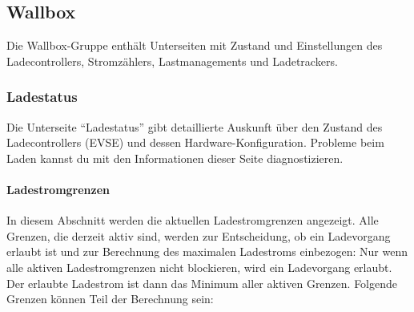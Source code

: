 \documentclass[a4paper,10pt]{article}
\begin{document}
\begin{multicols*}{2}
    \vfill
    \null

    \columnbreak

    \subsection{Wallbox}
    Die Wallbox-Gruppe enthält Unterseiten mit Zustand und Einstellungen des Ladecontrollers, Stromzählers, Lastmanagements und Ladetrackers.

    \subsubsection{Ladestatus}\label{evse}
    Die Unterseite \enquote{Ladestatus} gibt detaillierte Auskunft über den Zustand
    des Ladecontrollers (EVSE) und dessen Hardware-Konfiguration. Probleme beim Laden
    kannst du mit den Informationen dieser Seite diagnostizieren.

    \paragraph{Ladestromgrenzen}
    In diesem Abschnitt werden die aktuellen Ladestromgrenzen angezeigt. Alle Grenzen, die
    derzeit aktiv sind, werden zur Entscheidung, ob ein Ladevorgang erlaubt ist und zur Berechnung des maximalen Ladestroms einbezogen:
    Nur wenn alle aktiven Ladestromgrenzen nicht blockieren, wird ein Ladevorgang erlaubt.
    Der erlaubte Ladestrom ist dann das Minimum aller aktiven Grenzen. Folgende Grenzen können Teil der Berechnung sein:


\end{multicols*}
\end{document}
